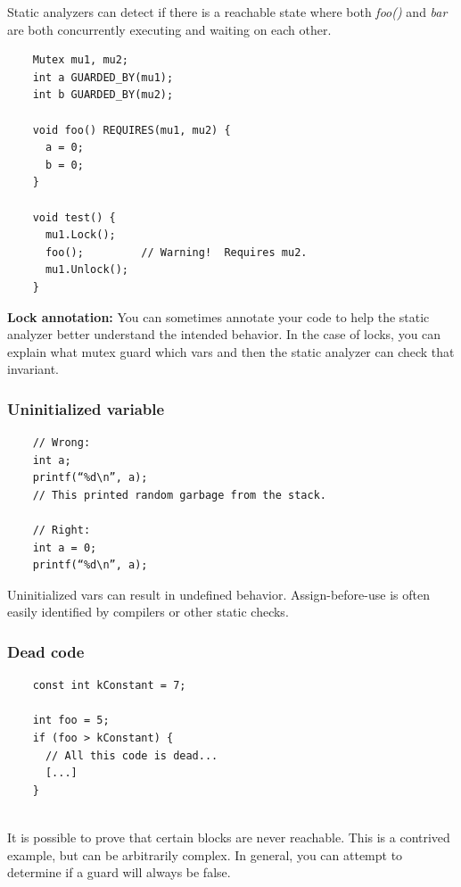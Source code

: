 \documentclass{article}
\begin{document}
Static analyzers can detect if there is a reachable state where both \textit{foo()} and \textit{bar} are both concurrently executing and waiting on each other.

\hrulefill

\begin{verbatim}
    Mutex mu1, mu2;
    int a GUARDED_BY(mu1);
    int b GUARDED_BY(mu2);
    
    void foo() REQUIRES(mu1, mu2) {
      a = 0;
      b = 0;
    }
    
    void test() {
      mu1.Lock();
      foo();         // Warning!  Requires mu2.
      mu1.Unlock();
    }    
\end{verbatim}

\textbf{Lock annotation:} You can sometimes annotate your code to help the static analyzer better understand the intended behavior. In the case of locks, you can explain what mutex guard which vars and then the static analyzer can check that invariant.

\subsubsection{Uninitialized variable}

\begin{verbatim}
    // Wrong:
    int a;
    printf(“%d\n”, a);
    // This printed random garbage from the stack.

    // Right:
    int a = 0;
    printf(“%d\n”, a);
\end{verbatim}

Uninitialized vars can result in undefined behavior. Assign-before-use is often easily identified by compilers or other static checks.

\subsubsection{Dead code}

\begin{verbatim}
    const int kConstant = 7;

    int foo = 5;
    if (foo > kConstant) {
      // All this code is dead...
      [...]
    }
    
\end{verbatim}

It is possible to prove that certain blocks are never reachable. This is a contrived example, but can be arbitrarily complex. In general, you can attempt to determine if a guard will always be false. 
\end{document}
